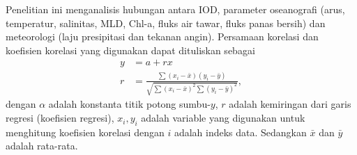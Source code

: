 \begin{spacing}{1.5}
		Penelitian ini menganalisis hubungan antara IOD, parameter oseanografi (arus, temperatur, salinitas, MLD, Chl-a, fluks air tawar, fluks panas bersih) dan meteorologi (laju presipitasi dan tekanan angin). Persamaan korelasi dan koefisien korelasi yang digunakan dapat dituliskan sebagai \cite{hidayat2023relationship,Haditiar2020}
		\begin{equation}
			\begin{aligned}
				y &= a+rx\\
				r &= \frac{\sum (x_i - \bar{x})(y_i - \bar{y})}{\sqrt{\sum (x_i-\bar{x})^2\sum (y_i-\bar{y})^2}},
			\end{aligned}
		\end{equation}
		dengan $\alpha$ adalah konstanta titik potong sumbu-$y$, $r$ adalah kemiringan dari garis regresi (koefisien regresi), $x_i, y_i$ adalah variable yang digunakan untuk menghitung koefisien korelasi dengan $i$ adalah indeks data. Sedangkan $\bar{x}$ dan $\bar{y}$ adalah rata-rata. 
\end{spacing}
\vspace{-0.5pc}

